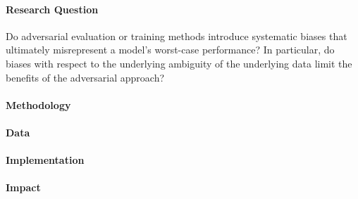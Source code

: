 \documentclass[10pt,a4paper]{article}
\begin{document}
\paragraph{Research Question}
Do adversarial evaluation or training methods introduce systematic biases that ultimately
misrepresent a model's worst-case performance? In particular, do biases with respect to the
underlying ambiguity of the underlying data limit the benefits of the adversarial approach?

\paragraph{Methodology}

\paragraph{Data}

\paragraph{Implementation}

\paragraph{Impact}


% 

\end{document}
